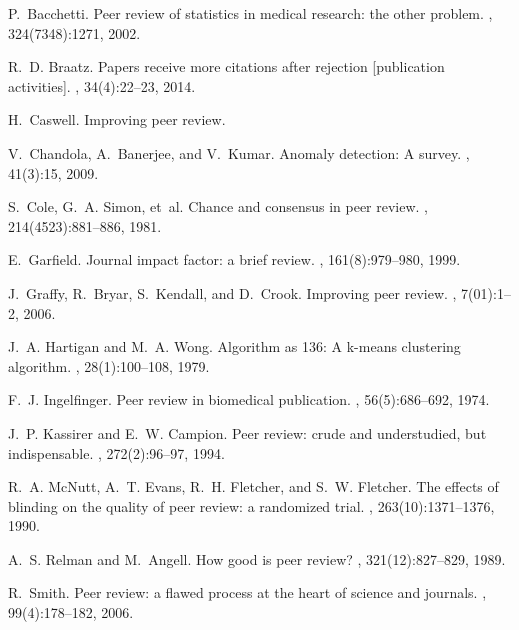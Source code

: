 \begin{thebibliography}{10}

P.~Bacchetti.
\newblock Peer review of statistics in medical research: the other problem.
, 324(7348):1271, 2002.

R.~D. Braatz.
\newblock Papers receive more citations after rejection [publication
  activities].
, 34(4):22--23, 2014.

H.~Caswell.
\newblock Improving peer review.

V.~Chandola, A.~Banerjee, and V.~Kumar.
\newblock Anomaly detection: A survey.
, 41(3):15, 2009.

S.~Cole, G.~A. Simon, et~al.
\newblock Chance and consensus in peer review.
, 214(4523):881--886, 1981.

E.~Garfield.
\newblock Journal impact factor: a brief review.
, 161(8):979--980, 1999.

J.~Graffy, R.~Bryar, S.~Kendall, and D.~Crook.
\newblock Improving peer review.
, 7(01):1--2, 2006.

J.~A. Hartigan and M.~A. Wong.
\newblock Algorithm as 136: A k-means clustering algorithm.
, 28(1):100--108, 1979.

F.~J. Ingelfinger.
\newblock Peer review in biomedical publication.
, 56(5):686--692, 1974.

J.~P. Kassirer and E.~W. Campion.
\newblock Peer review: crude and understudied, but indispensable.
, 272(2):96--97, 1994.

R.~A. McNutt, A.~T. Evans, R.~H. Fletcher, and S.~W. Fletcher.
\newblock The effects of blinding on the quality of peer review: a randomized
  trial.
, 263(10):1371--1376, 1990.

A.~S. Relman and M.~Angell.
\newblock How good is peer review?
, 321(12):827--829, 1989.

R.~Smith.
\newblock Peer review: a flawed process at the heart of science and journals.
, 99(4):178--182, 2006.

\end{thebibliography}


\fi